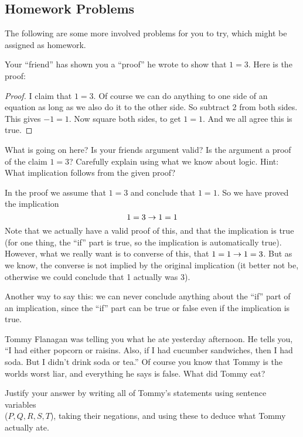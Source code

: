 

\subsection*{Homework Problems}

The following are some more involved problems for you to try, which might be assigned as homework.

\begin{questions}

\question Your ``friend'' has shown you a ``proof'' he wrote to show that $1 = 3$.  Here is the proof:

\begin{proof}
I claim that $1 = 3$.  Of course we can do anything to one side of an equation as long as we also do it to the other side.  So subtract 2 from both sides.  This gives $-1 = 1$.  Now square both sides, to get $1 = 1$.  And we all agree this is true.
\end{proof}

What is going on here?  Is your friends argument valid?  Is the argument a proof of the claim $1=3$?  Carefully explain using what we know about logic.  Hint: What implication follows from the given proof?

\begin{solution}
In the proof we assume that $1=3$ and conclude that $1=1$.  So we have proved the implication
\[1=3 \rightarrow 1=1\]
Note that we actually have a valid proof of this, and that the implication is true (for one thing, the ``if'' part is true, so the implication is automatically true).  However, what we really want is to converse of this, that $1=1 \rightarrow 1=3$.  But as we know, the converse is not implied by the original implication (it better not be, otherwise we could conclude that 1 actually was 3).  

Another way to say this: we can never conclude anything about the ``if'' part of an implication, since the ``if'' part can be true or false even if the implication is true.
\end{solution}



\question Tommy Flanagan was telling you what he ate yesterday afternoon.  He tells you, ``I had either popcorn or raisins.  Also, if I had cucumber sandwiches, then I had soda.  But I didn't drink soda or tea.''  Of course you know that Tommy is the worlds worst liar, and everything he says is false.  What did Tommy eat?  

Justify your answer by writing all of Tommy's statements using sentence variables \\ ($P, Q, R, S, T$), taking their negations, and using these to deduce what Tommy actually ate.


\end{questions}
